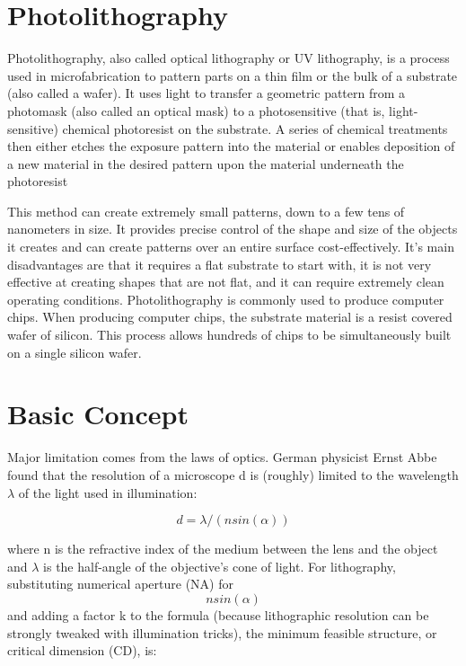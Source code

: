 \documentclass[12pt,a4paper]{report}
\begin{document}

\section{Photolithography}
Photolithography, also called optical lithography or UV lithography, is a process used in 
microfabrication to pattern parts on a thin film or the bulk of a substrate (also called a wafer). 
It uses light to transfer a geometric pattern from a photomask (also called an optical mask) to 
a photosensitive (that is, light-sensitive) chemical photoresist on the substrate. A series of 
chemical treatments then either etches the exposure pattern into the material or enables deposition 
of a new material in the desired pattern upon the material underneath the photoresist

This method can create extremely small patterns, down to a few tens of nanometers in size. 
It provides precise control of the shape and size of the objects it creates and can create 
patterns over an entire surface cost-effectively. It's main disadvantages are that it requires 
a flat substrate to start with, it is not very effective at creating shapes that are not flat, 
and it can require extremely clean operating conditions. 
Photolithography is commonly used to produce computer chips. When producing computer chips, 
the substrate material is a resist covered wafer of silicon. This process allows hundreds of 
chips to be simultaneously built on a single silicon wafer.





\section{Basic Concept}
Major limitation comes from the laws of optics. 
German physicist Ernst Abbe
 found that the resolution of a microscope d is 
 (roughly) limited to the 
wavelength $\lambda$ of the light used in illumination:

$$d =\lambda/(nsin(\alpha))$$


where n is the refractive index of the medium between the 
lens and the object and 
$\lambda$ is the half-angle of the objective's cone of 
light. For lithography, substituting
numerical aperture (NA) for $$nsin(\alpha)$$ and adding 
a factor k to the formula 
(because lithographic resolution can be strongly tweaked 
with illumination tricks),
the minimum feasible structure, or critical dimension 
(CD), is:
\end{document}
